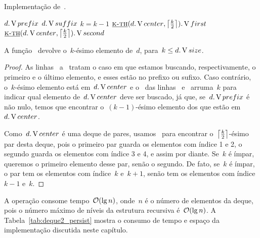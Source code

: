 \documentclass[main.tex]{subfiles}
\begin{document}
\begin{algorithm}
\caption{Implementação de~.} \label{lst:deque_kth}
\begin{algorithmic}[1]

	 \label{line:kth:if1}
		\State \Return $d.\V{prefix}$
	\EndIf
		\State \Return $d.\V{suffix}$ \label{line:kth:if2}
	\EndIf
	 \label{line:kth:if3}
		\State $k = k - 1$ \label{line:kth:if3e}
	\EndIf
		\State \Return $\funcAPI{k-th}{d.\V{center}, \ceil*{\frac{k}{2}}}.\V{first}$
	\Else
		\State \Return $\funcAPI{k-th}{d.\V{center}, \ceil*{\frac{k}{2}}}.\V{second}$
	\EndIf
\EndFunction

\end{algorithmic}
\end{algorithm}


\begin{proposition}
A função~ devolve o~$k$-ésimo elemento de~$d$, para~$k \leq d.\V{size}$.
\end{proposition}

\begin{proof}
As linhas~ a~ tratam o caso em que estamos buscando, respectivamente, o primeiro e o último elemento, e esses estão no prefixo ou sufixo. Caso contrário, o~$k$-ésimo elemento está em~$d.\V{center}$ e o~ das linhas~ e~ arruma~$k$ para indicar qual elemento de~$d.\V{center}$ deve ser buscado, já que, se~$d.\V{prefix}$ é não nulo, temos que encontrar o~$(k-1)$-ésimo elemento dos que estão em~$d.\V{center}$.

Como~$d.\V{center}$ é uma deque de pares, usamos~ para encontrar o~$\ceil*{\frac{k}{2}}$-ésimo par desta deque, pois o primeiro par guarda os elementos com índice 1 e 2, o segundo guarda os elementos com índice 3 e 4, e assim por diante. Se~$k$ é ímpar, queremos o primeiro elemento desse par, senão o segundo. De fato, se~$k$ é ímpar, o par tem os elementos com índice~$k$ e~$k+1$, senão tem os elementos com índice~$k-1$ e~$k$.
\end{proof}

A operação consome tempo~$\Oh(\lg n)$, onde~$n$ é o número de elementos da deque, pois o número máximo de níveis da estrutura recursiva é~$\Oh(\lg n)$. A Tabela~\ref{tab:deque2_persist} mostra o consumo de tempo e espaço da implementação discutida neste capítulo.
\end{document}
